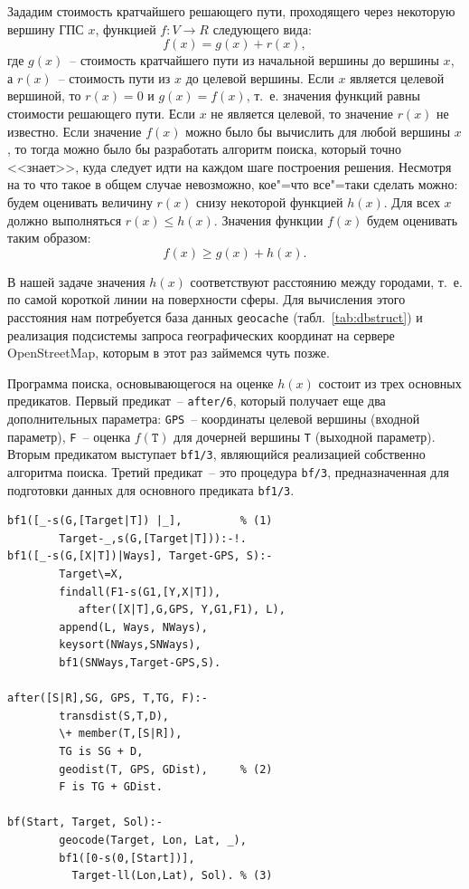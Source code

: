 \documentclass[a4paper,14pt, openany, twoside, draft]{extbook} %
\begin{document}
Зададим стоимость кратчайшего решающего пути, проходящего через некоторую вершину ГПС $x$, функцией $f\!\!:V\to R$ следующего вида:
\begin{equation}
  \label{eq:1}
  f(x)=g(x)+r(x),
\end{equation}
где $g(x)$~-- стоимость кратчайшего пути из начальной вершины до вершины $x$, а $r(x)$~-- стоимость пути из $x$ до целевой вершины.  Если $x$ является целевой вершиной, то $r(x)=0$ и $g(x)=f(x)$, т.~е. значения функций равны стоимости решающего пути.  Если $x$ не является целевой, то значение $r(x)$ не известно.  Если значение $f(x)$ можно было бы вычислить для любой вершины $x$, то тогда можно было бы разработать алгоритм поиска, который точно <<знает>>, куда следует идти на каждом шаге построения решения.  Несмотря на то что такое в общем случае невозможно, кое"=что все"=таки сделать можно: будем оценивать величину $r(x)$ снизу некоторой функцией $h(x)$.  Для всех $x$ должно выполняться $r(x)\leqslant h(x)$.  Значения функции $f(x)$ будем оценивать таким образом:
\begin{equation}
  \label{eq:2}
  f(x)\geqslant g(x)+h(x).
\end{equation}

В нашей задаче значения $h(x)$ соответствуют расстоянию между городами, т.~е. по самой короткой линии на поверхности сферы.  Для вычисления этого расстояния нам потребуется база данных \texttt{geocache} (табл.~\ref{tab:dbstruct}) и реализация подсистемы запроса географических координат на сервере \foreignlanguage{english}{OpenStreetMap}, которым в этот раз займемся чуть позже.

Программа поиска, основывающегося на оценке $h(x)$ состоит из трех основных предикатов.  Первый предикат~-- \texttt{after/6}, который получает еще два дополнительных параметра: \texttt{GPS}~-- координаты целевой вершины (входной параметр), \texttt{F}~-- оценка $f(\mathtt{T})$ для дочерней вершины \texttt{T} (выходной параметр).  Вторым предикатом выступает \texttt{bf1/3}, являющийся реализацией собственно алгоритма поиска.  Третий предикат~-- это процедура \texttt{bf/3}, предназначенная для подготовки данных для основного предиката \texttt{bf1/3}.

\begin{verbatim}
bf1([_-s(G,[Target|T]) |_],         % (1)
        Target-_,s(G,[Target|T])):-!.
bf1([_-s(G,[X|T])|Ways], Target-GPS, S):-
        Target\=X,
        findall(F1-s(G1,[Y,X|T]),
           after([X|T],G,GPS, Y,G1,F1), L),
        append(L, Ways, NWays),
        keysort(NWays,SNWays),
        bf1(SNWays,Target-GPS,S).

after([S|R],SG, GPS, T,TG, F):-
        transdist(S,T,D),
        \+ member(T,[S|R]),
        TG is SG + D,
        geodist(T, GPS, GDist),     % (2)
        F is TG + GDist.

bf(Start, Target, Sol):-
        geocode(Target, Lon, Lat, _),
        bf1([0-s(0,[Start])],
          Target-ll(Lon,Lat), Sol). % (3)
\end{verbatim}
\end{document}
